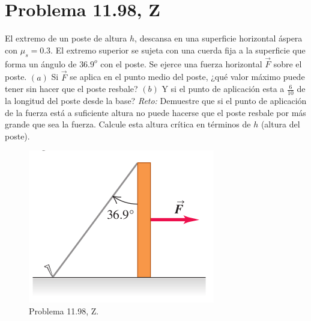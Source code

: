 \section*{Problema 11.98, Z}
El extremo de un poste de altura $h$, descansa en una superficie horizontal áspera con $\mu _s = 0.3$. El extremo superior se sujeta con una cuerda fija a la superficie que forma un ángulo de $36.9 ^o$ con el poste. Se ejerce una fuerza horizontal $\vec{F}$ sobre el poste. $(a)$ Si $\vec{F}$ se aplica en el punto medio del poste, ¿qué valor máximo puede tener sin hacer que el poste resbale? $(b)$ Y si el punto de aplicación esta a $\frac{6}{10}$ de la longitud del poste desde la base? \textit{Reto: } Demuestre que si el punto de aplicación de la fuerza está a suficiente altura no puede hacerse que el poste resbale por más grande que sea la fuerza. Calcule esta altura crítica en términos de $h$ (altura del poste).


\begin{figure}[H]
	\centering
	\includegraphics[scale=0.5]{./img/poste.png}
	\caption{Problema 11.98, Z.}
	\label{poste}
\end{figure}








